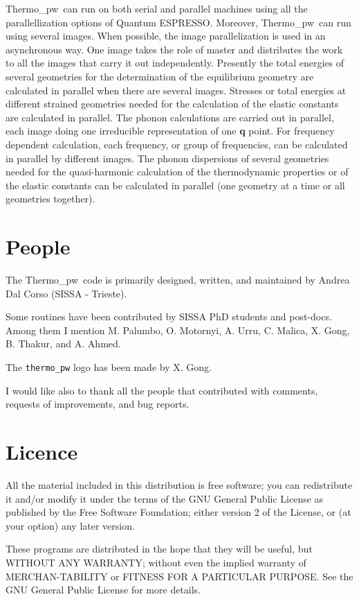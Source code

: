 \documentclass[12pt,a4paper,twoside]{report}
\def\qe{{\sc Quantum ESPRESSO}}
\def\thermo{{\sc Thermo}\_{\sc pw}}
\begin{document}
\thermo\ can run on both serial and parallel machines using all 
the parallellization options of \qe. Moreover, \thermo\ can run using 
several images.
When possible, the image parallelization is used in an asynchronous way.
One image takes the role of master and distributes the work 
to all the images that carry it out independently. Presently 
the total energies of several geometries for the determination of the 
equilibrium geometry are calculated in parallel when
there are several images. Stresses or total energies at different strained 
geometries needed for the calculation of the elastic constants are 
calculated in parallel. 
The phonon calculations are carried out in parallel, each image doing one 
irreducible representation of one {\bf q} point. For frequency dependent 
calculation, each frequency, or group of frequencies, can be calculated 
in parallel by different images.
The phonon dispersions of several geometries needed
for the quasi-harmonic calculation of the thermodynamic properties or
of the elastic constants can be calculated in parallel (one geometry at 
a time or all geometries together).

\newpage
{\color{coral}\section{People}}
\color{black}
The \thermo\ code is primarily designed, written, and maintained by Andrea 
Dal Corso 
(SISSA - Trieste).

Some routines have been contributed by SISSA PhD students and post-docs. 
Among them I mention M. Palumbo, O. Motornyi, A. Urru, C. Malica, X. Gong, 
B. Thakur, and A. Ahmed.

The \texttt{thermo\_pw} logo has been made by X. Gong.

I would like also to thank all the people that contributed with comments, 
requests of improvements, and bug reports. 

\newpage
{\color{coral}\section{Licence}}
\color{black}
All the material included in this distribution is free software; you can redistribute it and/or modify it under the terms of the GNU General Public License as published by the Free Software Foundation; either version 2 of the License, or (at your option) any later version.

These programs are distributed in the hope that they will be useful, but WITHOUT ANY WARRANTY; without even the implied warranty of MERCHAN-TABILITY or FITNESS FOR A PARTICULAR PURPOSE. See the GNU General Public License for more details.
\end{document}

